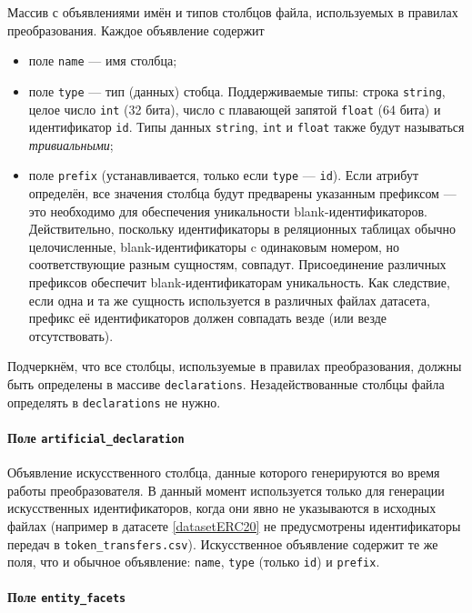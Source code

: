 Массив с объявлениями имён и типов столбцов файла, используемых в правилах преобразования.
Каждое объявление содержит
\begin{itemize}
  \item поле \texttt{name} --- имя столбца;
  \item поле \texttt{type} --- тип (данных) стобца. Поддерживаемые типы: строка \texttt{string},
    целое число \texttt{int} (32 бита), число с плавающей запятой \texttt{float} (64 бита) и
    идентификатор \texttt{id}. Типы данных \texttt{string}, \texttt{int} и \texttt{float} также будут
    называться \textit{тривиальными};
    \item поле \texttt{prefix} (устанавливается, только если \texttt{type} --- \texttt{id}). Если
атрибут определён, все значения столбца будут предварены указанным префиксом --- это необходимо для
обеспечения уникальности blank-идентификаторов. Действительно, поскольку идентификаторы в реляционных
таблицах обычно целочисленные, blank-идентификаторы c одинаковым номером, но соответствующие разным
сущностям, совпадут. Присоединение различных префиксов обеспечит blank-идентификаторам уникальность.
Как следствие, если одна и та же сущность используется в различных файлах датасета, префикс её
идентификаторов должен совпадать везде (или везде отсутствовать).
\end{itemize}
Подчеркнём, что все столбцы, используемые в правилах преобразования, должны быть определены в
массиве \texttt{declarations}. Незадействованные столбцы файла определять в \texttt{declarations}
не нужно.

\paragraph{Поле \texttt{artificial\_declaration}}

Объявление искусственного столбца, данные которого генерируются во время работы преобразователя. В данный
момент используется только для генерации искусственных идентификаторов, когда они явно не указываются в
исходных файлах (например в датасете \ref{datasetERC20} не предусмотрены идентификаторы передач в
\texttt{token\_transfers.csv}). Искусственное объявление содержит те же поля, что и обычное объявление:
\texttt{name}, \texttt{type} (только \texttt{id}) и \texttt{prefix}.

\paragraph{Поле \texttt{entity\_facets}}

